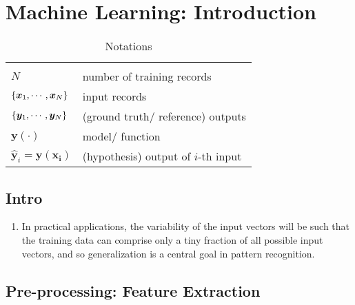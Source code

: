 \chapter{Machine Learning: Introduction}

\begin{customArrayStretch}{1.5}
\begin{longtable}{l p{7cm}}

\hline\endfirsthead
\hline\endhead
\hline\endfoot
\hline
\caption*{Notations} \\
\endlastfoot

$N$ & number of training records\\ \hline

$\left\{\bm{x}_1, \cdots , \bm{x}_N \right\}$ & input records \\ \hline

$\left\{\bm{y}_1, \cdots , \bm{y}_N \right\}$ & (ground truth/ reference) outputs \\ \hline

$\bm{y}(\cdot)$ & model/ function \\ \hline

$\hat{\bm{y}}_i = \bm{y}(\bm{x_i})$ & (hypothesis) output of $i$-th input \\



\end{longtable}
\end{customArrayStretch}


\section{Intro}

\begin{enumerate}
    \item In practical applications, the variability of the input vectors will be such that the training data can comprise only a tiny fraction of all possible input vectors, and so generalization is a central goal in pattern recognition.
    \hfill \cite{ml/book/Pattern-Recognition-And-Machine-Learning/Christopher-M-Bishop}
\end{enumerate}





\section{Pre-processing: Feature Extraction}

